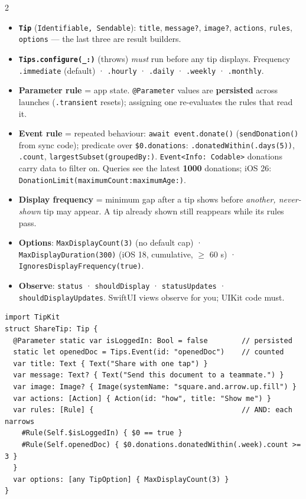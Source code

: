 \documentclass[8pt]{extarticle}
\newcommand\ct[1]{\texttt{#1}}
\newcommand\hd[1]{\par\vspace{3pt}\noindent{\bfseries\color{sheetBlue}#1}\par\vspace{1pt}}
\begin{document}
\begin{multicols}{2}
\raggedright{}

\hd{How it works}
\begin{itemize}
  \item \textbf{\ct{Tip}} (\ct{Identifiable, Sendable}): \ct{title}, \ct{message?}, \ct{image?},
        \ct{actions}, \ct{rules}, \ct{options} — the last three are result builders.
  \item \textbf{\ct{Tips.configure(\_:)}} (throws) \emph{must} run before any tip displays.
        Frequency \ct{.immediate} (default) · \ct{.hourly} · \ct{.daily} · \ct{.weekly} · \ct{.monthly}.
  \item \textbf{Parameter rule} = app state. \ct{@Parameter} values are \textbf{persisted} across
        launches (\ct{.transient} resets); assigning one re-evaluates the rules that read it.
  \item \textbf{Event rule} = repeated behaviour: \ct{await event.donate()} (\ct{sendDonation()} from
        sync code); predicate over \ct{\$0.donations}: \ct{.donatedWithin(.days(5))}, \ct{.count},
        \ct{largestSubset(groupedBy:)}. \ct{Event<Info: Codable>} donations carry data to filter on.
        Queries see the latest \textbf{1000} donations; iOS 26: \ct{DonationLimit(maximumCount:maximumAge:)}.
  \item \textbf{Display frequency} = minimum gap after a tip shows before \emph{another, never-shown}
        tip may appear. A tip already shown still reappears while its rules pass.
  \item \textbf{Options}: \ct{MaxDisplayCount(3)} (no default cap) · \ct{MaxDisplayDuration(300)}
        (iOS 18, cumulative, $\geq$ 60 s) · \ct{IgnoresDisplayFrequency(true)}.
  \item \textbf{Observe}: \ct{status} · \ct{shouldDisplay} · \ct{statusUpdates} ·
        \ct{shouldDisplayUpdates}. SwiftUI views observe for you; UIKit code must.
\end{itemize}

\hd{Example — the tip}
\begin{lstlisting}[language=SwiftSheet]
import TipKit
struct ShareTip: Tip {
  @Parameter static var isLoggedIn: Bool = false        // persisted
  static let openedDoc = Tips.Event(id: "openedDoc")    // counted
  var title: Text { Text("Share with one tap") }
  var message: Text? { Text("Send this document to a teammate.") }
  var image: Image? { Image(systemName: "square.and.arrow.up.fill") }
  var actions: [Action] { Action(id: "how", title: "Show me") }
  var rules: [Rule] {                                   // AND: each narrows
    #Rule(Self.$isLoggedIn) { $0 == true }
    #Rule(Self.openedDoc) { $0.donations.donatedWithin(.week).count >= 3 }
  }
  var options: [any TipOption] { MaxDisplayCount(3) }
}
\end{lstlisting}


\end{multicols}
\end{document}
